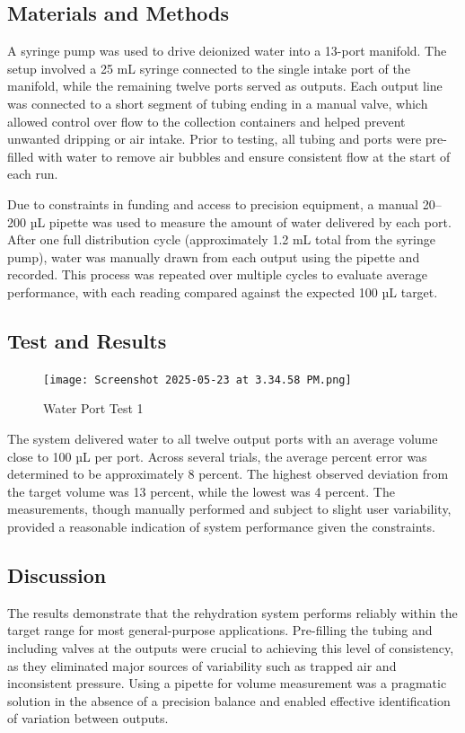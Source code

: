 \documentclass[12pt]{article}
\begin{document}
        \subsection{Materials and Methods}
        A syringe pump was used to drive deionized water into a 13-port manifold. The setup involved a 25 mL syringe connected to the single intake port of the manifold, while the remaining twelve ports served as outputs. Each output line was connected to a short segment of tubing ending in a manual valve, which allowed control over flow to the collection containers and helped prevent unwanted dripping or air intake. Prior to testing, all tubing and ports were pre-filled with water to remove air bubbles and ensure consistent flow at the start of each run.
        
        Due to constraints in funding and access to precision equipment, a manual 20–200 µL pipette was used to measure the amount of water delivered by each port. After one full distribution cycle (approximately 1.2 mL total from the syringe pump), water was manually drawn from each output using the pipette and recorded. This process was repeated over multiple cycles to evaluate average performance, with each reading compared against the expected 100 µL target.

    \subsection{Test and Results}
    \begin{figure}[H]
        \centering
        \texttt{[image: Screenshot 2025-05-23 at 3.34.58 PM.png]}
        \caption{Water Port Test 1}
        \label{fig:enter-label}
    \end{figure}
        The system delivered water to all twelve output ports with an average volume close to 100 µL per port. Across several trials, the average percent error was determined to be approximately 8 percent. The highest observed deviation from the target volume was 13 percent, while the lowest was 4 percent. The measurements, though manually performed and subject to slight user variability, provided a reasonable indication of system performance given the constraints.
    
    
    \subsection{Discussion}
        The results demonstrate that the rehydration system performs reliably within the target range for most general-purpose applications. Pre-filling the tubing and including valves at the outputs were crucial to achieving this level of consistency, as they eliminated major sources of variability such as trapped air and inconsistent pressure. Using a pipette for volume measurement was a pragmatic solution in the absence of a precision balance and enabled effective identification of variation between outputs.
        
\end{document}
